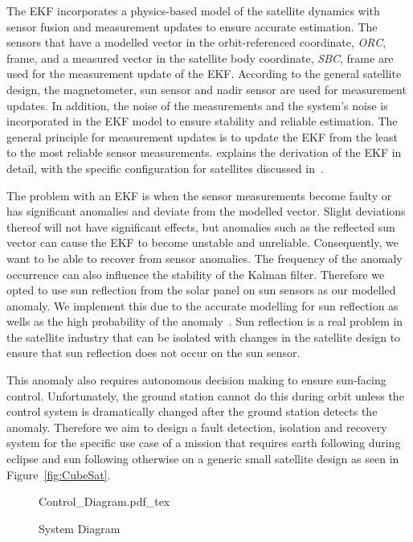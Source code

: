 \documentclass[letterpaper, 10 pt, conference]{ieeeconf}  %
\begin{document}
The EKF incorporates a physics-based model of the satellite dynamics with sensor fusion and measurement updates to ensure accurate estimation. The sensors that have a modelled vector in the orbit-referenced coordinate, \emph{ORC}, frame, and a measured vector in the satellite body coordinate, \emph{SBC}, frame are used for the measurement update of the EKF. According to the general satellite design, the magnetometer, sun sensor and nadir sensor are used for measurement updates. In addition, the noise of the measurements and the system's noise is incorporated in the EKF model to ensure stability and reliable estimation. The general principle for measurement updates is to update the EKF from the least to the most reliable sensor measurements. \textcite{Jones2017} explains the derivation of the EKF in detail, with the specific configuration for satellites discussed in~\textcite{JansevanVuuren2015, Jordaan2016, auret2012design}.

The problem with an EKF is when the sensor measurements become faulty or has significant anomalies and deviate from the modelled vector. Slight deviations thereof will not have significant effects, but anomalies such as the reflected sun vector can cause the EKF to become unstable and unreliable. Consequently, we want to be able to recover from sensor anomalies. The frequency of the anomaly occurrence can also influence the stability of the Kalman filter. Therefore we opted to use sun reflection from the solar panel on sun sensors as our modelled anomaly. We implement this due to the accurate modelling for sun reflection as wells as the high probability of the anomaly~\cite{steyn_2021}. Sun reflection is a real problem in the satellite industry that can be isolated with changes in the satellite design to ensure that sun reflection does not occur on the sun sensor.

This anomaly also requires autonomous decision making to ensure sun-facing control. Unfortunately, the ground station cannot do this during orbit unless the control system is dramatically changed after the ground station detects the anomaly. Therefore we aim to design a fault detection, isolation and recovery system for the specific use case of a mission that requires earth following during eclipse and sun following otherwise on a generic small satellite design as seen in Figure~\ref{fig:CubeSat}.


\begin{figure}[h!b!t]
	\centering
	\def\svgwidth{14cm}
	{Control_Diagram.pdf_tex}
	\caption{System Diagram}
	\label{fig:System_Diagram}
\end{figure}
\end{document}
